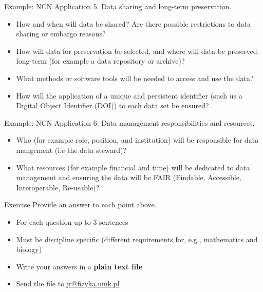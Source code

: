 \documentclass[10pt]{beamer}
\begin{document}
\begin{frame}{Example: NCN Application}
\textcolor{subtitle}{5. Data sharing and long-term preservation.}
  \begin{itemize}
    \item How and when will data be shared? Are there possible restrictions to data sharing or embargo reasons?
    \\
    {\color{gray}{If freely accessible or partially, upon request.}}
    \item How will data for preservation be selected, and where will data be preserved long-term (for example a data repository or archive)?
    \\
    {\color{gray}{Should be at least 5 years.}}
    \item What methods or software tools will be needed to access and use the data?
    \item How will the application of a unique and persistent identifier (such us a Digital Object Identifier (DOI)) to each data set be ensured?
    \\
    {\color{gray}{Zenodo, arXiv, publications.}}
  \end{itemize}
\end{frame}

\begin{frame}{Example: NCN Application}
\textcolor{subtitle}{6. Data management responsibilities and resources.}
  \begin{itemize}
    \item Who (for example role, position, and institution) will be responsible for data mangement (i.e the data steward)?
    \\
    {\color{gray}{Do you manage your data yourself or is there someone who does it for you?}}
    \item What resources (for example financial and time) will be dedicated to data management and ensuring the data will be FAIR (Findable, Accessible, Interoperable, Re-usable)?
  \end{itemize}
\end{frame}

\begin{frame}{Exercise}
\textcolor{subtitle}{Provide an answer to each point above.}
  \begin{itemize}
    \item For each question up to 3 sentences
    \item Must be discipline specific (different requirements for, e.g., mathematics and biology)
    \item Write your answers in a \textbf{plain text file}
    \item Send the file to \url{jr@fizyka.umk.pl}
  \end{itemize}
\end{frame}
\end{document}
